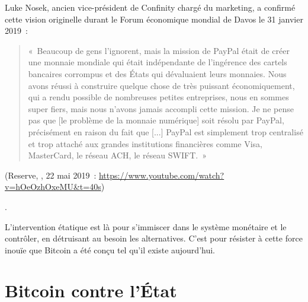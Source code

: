 {Luke Nosek, ancien vice-président de Confinity chargé du marketing, a confirmé cette vision originelle durant le Forum économique mondial de Davos le 31 janvier 2019~:

\begin{quote}
\footnotesize «~Beaucoup de gens l'ignorent, mais la mission de PayPal était de créer une monnaie mondiale qui était indépendante de l'ingérence des cartels bancaires corrompus et des États qui dévaluaient leurs monnaies. Nous avons réussi à construire quelque chose de très puissant économiquement, qui a rendu possible de nombreuses petites entreprises, nous en sommes super fiers, mais nous n'avons jamais accompli cette mission. Je ne pense pas que [le problème de la monnaie numérique] soit résolu par PayPal, précisément en raison du fait que [...] PayPal est simplement trop centralisé et trop attaché aux grandes institutions financières comme Visa, MasterCard, le réseau ACH, le réseau SWIFT.~»
\end{quote}
(Reserve, , 22 mai 2019~: \url{https://www.youtube.com/watch?v=hOeOzhOxeMU\&t=40s})}.

L'intervention étatique est là pour s'immiscer dans le système monétaire et le contrôler, en détruisant au besoin les alternatives. C'est pour résister à cette force inouïe que Bitcoin a été conçu tel qu'il existe aujourd'hui.

\section*{Bitcoin contre l'État} %

